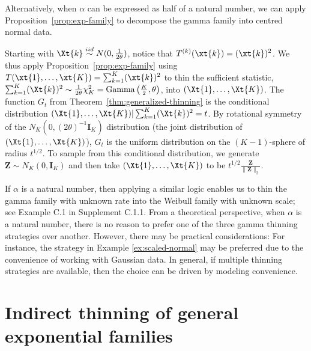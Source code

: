 \documentclass[12pt]{article}
\begin{document}
Alternatively, when $\alpha$ can be expressed as half of a natural number, we can apply Proposition~\ref{prop:exp-family} to decompose the gamma family into centred normal data. 

\begin{exmp}[Thinning $\text{Gamma}(\alpha,\theta)$ with $\alpha=K/2$ known, approach 2] \label{ex:scaled-normal}
Starting with $\Xt{k} \overset{iid}{\sim} N(0,\frac{1}{2\theta})$, notice that $T^{(k)}(\xt{k})=(\xt{k})^2$. We thus apply Proposition~\ref{prop:exp-family} using $T(\xt{1},\dots,\xt{K})=\sum_{k=1}^K(\xt{k})^2$ to thin the sufficient statistic, $\sum_{k=1}^K(\Xt{k})^2\sim\frac{1}{2\theta}\chi_K^2=\text{Gamma}\left(\frac{K}{2},\theta\right)$, into $(\Xt{1},\dots,\Xt{K})$. The function $G_t$ from Theorem~\ref{thm:generalized-thinning} is the conditional distribution $(\Xt{1},\dots,\Xt{K})|\sum_{k=1}^K(\Xt{k})^2=t$. By rotational symmetry of the $N_K(0,(2\theta)^{-1}\mathbf{I}_K)$ distribution (the joint distribution of $(\Xt{1},\dots,\Xt{K})$), $G_t$ is the uniform distribution on the $(K-1)$-sphere of radius $t^{1/2}$. To sample from this conditional distribution, we generate $\mathbf{Z}\sim N_K(0,\mathbf{I}_K)$ and then take  $(\Xt{1},\dots,\Xt{K})$ to be $t^{1/2}\frac{\mathbf{Z}}{\|\mathbf{Z}\|_2}$.
\end{exmp}
If $\alpha$ is a natural number, then applying a similar logic enables us to thin the gamma family with unknown rate into the Weibull family with unknown scale; see Example C.1 in Supplement C.1.1. From a theoretical perspective, when $\alpha$ is a natural number, there is no reason to prefer one of the  three gamma thinning strategies over another. However, there may be practical considerations: For instance,  the strategy  in Example \ref{ex:scaled-normal} may be preferred due to the convenience of working with Gaussian data. In general, if multiple thinning strategies are available, then the choice  can be driven by modeling convenience. 

 







\section{Indirect thinning of general exponential families} \label{sec:general-exp}
\end{document}
